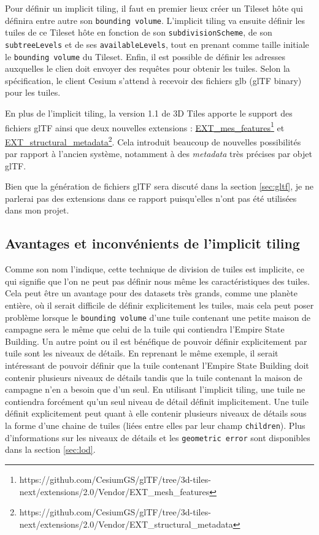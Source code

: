 Pour définir un implicit tiling, il faut en premier lieux créer un Tileset hôte qui définira entre autre son \texttt{bounding volume}. L'implicit tiling va ensuite définir les tuiles de ce Tileset hôte en fonction de son \texttt{subdivisionScheme}, de son \texttt{subtreeLevels} et de ses \texttt{availableLevels}, tout en prenant comme taille initiale le \texttt{bounding volume} du Tileset. Enfin, il est possible de définir les adresses auxquelles le clien doit envoyer des requêtes pour obtenir les tuiles. Selon la spécification, le client Cesium s'attend à recevoir des fichiers glb (glTF binary) pour les tuiles.

En plus de l'implicit tiling, la version 1.1 de 3D Tiles apporte le support des fichiers glTF ainsi que deux nouvelles extensions : \href{https://github.com/CesiumGS/glTF/tree/3d-tiles-next/extensions/2.0/Vendor/EXT_mesh_features}{EXT\_mes\_features}\footnote{https://github.com/CesiumGS/glTF/tree/3d-tiles-next/extensions/2.0/Vendor/EXT_mesh_features} et \href{https://github.com/CesiumGS/glTF/tree/3d-tiles-next/extensions/2.0/Vendor/EXT_structural_metadata}{EXT\_structural\_metadata}\footnote{https://github.com/CesiumGS/glTF/tree/3d-tiles-next/extensions/2.0/Vendor/EXT_structural_metadata}. Cela introduit beaucoup de nouvelles possibilités par rapport à l'ancien système, notamment à des \textit{metadata} très précises par objet glTF.

Bien que la génération de fichiers glTF sera discuté dans la section \ref{sec:gltf}, je ne parlerai pas des extensions dans ce rapport puisqu'elles n'ont pas été utilisées dans mon projet.

\subsection{Avantages et inconvénients de l'implicit tiling}

Comme son nom l'indique, cette technique de division de tuiles est implicite, ce qui signifie que l'on ne peut pas définir nous même les caractéristiques des tuiles. Cela peut être un avantage pour des datasets très grands, comme une planète entière, où il serait difficile de définir explicitement les tuiles, mais cela peut poser problème lorsque le \texttt{bounding volume} d'une tuile contenant une petite maison de campagne sera le même que celui de la tuile qui contiendra l'Empire State Building. Un autre point ou il est bénéfique de pouvoir définir explicitement par tuile sont les niveaux de détails. En reprenant le même exemple, il serait intéressant de pouvoir définir que la tuile contenant l'Empire State Building doit contenir plusieurs niveaux de détails tandis que la tuile contenant la maison de campagne n'en a besoin que d'un seul. En utilisant l'implicit tiling, une tuile ne contiendra forcément qu'un seul niveau de détail définit implicitement. Une tuile définit explicitement peut quant à elle contenir plusieurs niveaux de détails sous la forme d'une chaine de tuiles (liées entre elles par leur champ \texttt{children}). Plus d'informations sur les niveaux de détails et les \texttt{geometric error} sont disponibles dans la section \ref{sec:lod}.


